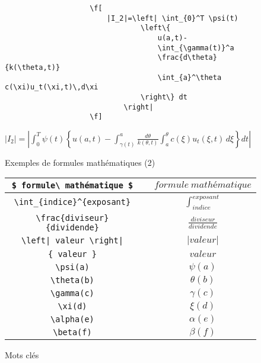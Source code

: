 			\begin{figure}[H]
				\begin{changemargin}{-2.5cm}{-2.5cm}
				\begin{tcolorbox}
				\begin{verbatim}
					\f[
					    |I_2|=\left| \int_{0}^T \psi(t) 
					            \left\{ 
					                u(a,t)-
					                \int_{\gamma(t)}^a 
					                \frac{d\theta}{k(\theta,t)}
					                \int_{a}^\theta c(\xi)u_t(\xi,t)\,d\xi
					            \right\} dt
					        \right|
					\f]
				\end{verbatim}
				\end{tcolorbox}
				\end{changemargin}

				\begin{changemargin}{-2.5cm}{-2.5cm}
				\begin{tcolorbox}
					$ |I_2|=\left| \int_{0}^T \psi(t) 
						\left\{ 
							u(a,t)-
							\int_{\gamma(t)}^a 
							\frac{d\theta}{k(\theta,t)}
							\int_{a}^\theta c(\xi)u_t(\xi,t)\,d\xi
						\right\} dt
					\right| $
				\end{tcolorbox}
				\end{changemargin}
				\caption{Exemples de formules mathématiques (2)}
			\end{figure}

			\begin{figure}[H]
				\begin{tabular*}{\textwidth}{| c@{\extracolsep{\fill} } l@{\extracolsep{\fill}->} c |}
					\hline
					\verb+$ formule\ mathématique $+ & & $ formule\ mathématique $ \\ \hline
					\verb+\int_{indice}^{exposant}+ & & $ \int_{indice}^{exposant} $ \\ \hline
					\verb+\frac{diviseur}{dividende}+ & & $ \frac{diviseur}{dividende} $ \\ \hline
					\verb+\left| valeur \right|+ & & $ \left| valeur \right| $ \\ \hline
					\verb+{ valeur }+ & & $ { valeur } $ \\ \hline
					\verb+\psi(a)+ & & $ \psi(a) $ \\ \hline
					\verb+\theta(b)+ & & $ \theta(b) $ \\ \hline
					\verb+\gamma(c)+ & & $ \gamma(c) $ \\ \hline
					\verb+\xi(d)+ & & $ \xi(d) $ \\ \hline
					\verb+\alpha(e)+ & & $ \alpha(e) $ \\ \hline
					\verb+\beta(f)+ & & $ \beta(f) $ \\ \hline
				\end{tabular*}
				\caption{Mots clés}
			\end{figure}

